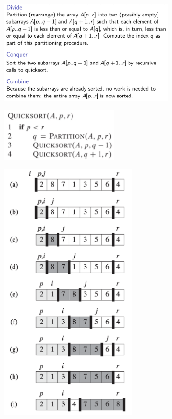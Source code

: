 \documentclass[10pt,a4paper,twocolumn]{article}
\begin{document}
\begin{center}
	\includegraphics[width=9cm]{images/quick-sort-split}
\end{center}

\begin{center}
	\includegraphics[width=6cm]{images/runtime-quicksort}
\end{center}

\begin{center}
	\includegraphics[width=7cm]{images/quicksort-example}
\end{center}
\end{document}
